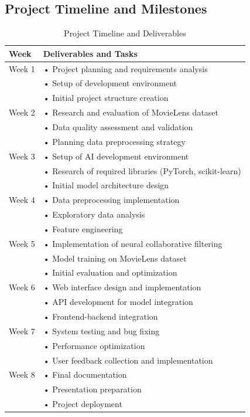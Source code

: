 \documentclass[12pt]{article}
\begin{document}
\subsection{Project Timeline and Milestones}
\nopagebreak[4]
\begin{table}[!htbp]
\setlength{\tabcolsep}{4pt}
\small
\centering
\begin{tabular}{p{1.5cm}|p{13cm}}
\toprule
Week & Deliverables and Tasks \\
\midrule
Week 1 & • Project planning and requirements analysis \\
       & • Setup of development environment \\
       & • Initial project structure creation \\
\midrule
Week 2 & • Research and evaluation of MovieLens dataset \\
       & • Data quality assessment and validation \\
       & • Planning data preprocessing strategy \\
\midrule
Week 3 & • Setup of AI development environment \\
       & • Research of required libraries (PyTorch, scikit-learn) \\
       & • Initial model architecture design \\
\midrule
Week 4 & • Data preprocessing implementation \\
       & • Exploratory data analysis \\
       & • Feature engineering \\
\midrule
Week 5 & • Implementation of neural collaborative filtering \\
       & • Model training on MovieLens dataset \\
       & • Initial evaluation and optimization \\
\midrule
Week 6 & • Web interface design and implementation \\
       & • API development for model integration \\
       & • Frontend-backend integration \\
\midrule
Week 7 & • System testing and bug fixing \\
       & • Performance optimization \\
       & • User feedback collection and implementation \\
\midrule
Week 8 & • Final documentation \\
       & • Presentation preparation \\
       & • Project deployment \\
\bottomrule
\end{tabular}
\caption{Project Timeline and Deliverables}
\label{tab:timeline}
\end{table}
\end{document}
